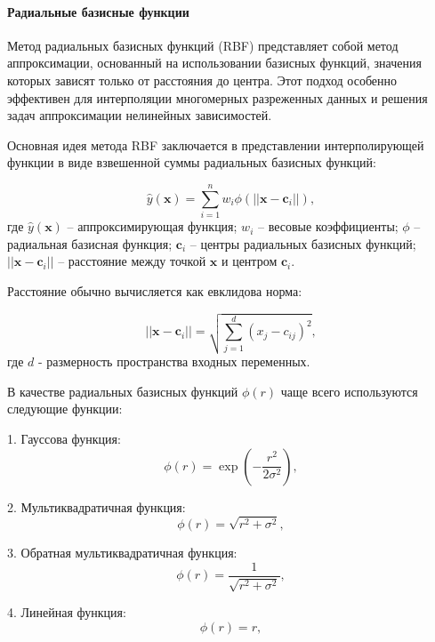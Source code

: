 \paragraph{Радиальные базисные функции}

Метод радиальных базисных функций (RBF) представляет собой метод аппроксимации, основанный
на использовании базисных функций, значения которых зависят только от расстояния до центра.
Этот подход особенно эффективен для интерполяции многомерных разреженных данных и решения задач аппроксимации нелинейных зависимостей.

Основная идея метода RBF заключается в представлении интерполирующей функции в виде взвешенной суммы радиальных базисных функций:

\begin{equation}
\hat{y}(\mathbf{x}) = \sum_{i=1}^{n} w_i \phi(||\mathbf{x} - \mathbf{c}_i||),
\end{equation}
где $\hat{y}(\mathbf{x})$ -- аппроксимирующая функция;
$w_i$ -- весовые коэффициенты;
$\phi$ -- радиальная базисная функция;
$\mathbf{c}_i$ -- центры радиальных базисных функций;
$||\mathbf{x} - \mathbf{c}_i||$ -- расстояние между точкой $\mathbf{x}$ и центром $\mathbf{c}_i$.

Расстояние обычно вычисляется как евклидова норма:

\begin{equation}
||\mathbf{x} - \mathbf{c}_i|| = \sqrt{\sum_{j=1}^{d} (x_j - c_{ij})^2},
\end{equation}
где $d$ - размерность пространства входных переменных.

В качестве радиальных базисных функций $\phi(r)$ чаще всего используются следующие функции:

1. Гауссова функция:
\begin{equation}
\phi(r) = \exp\left(-\frac{r^2}{2\sigma^2}\right),
\end{equation}

2. Мультиквадратичная функция:
\begin{equation}
\phi(r) = \sqrt{r^2 + \sigma^2},
\end{equation}

3. Обратная мультиквадратичная функция:
\begin{equation}
\phi(r) = \frac{1}{\sqrt{r^2 + \sigma^2}},
\end{equation}

4. Линейная функция:
\begin{equation}
\phi(r) = r,
\end{equation}

